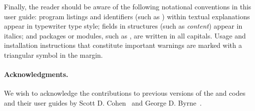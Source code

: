 Finally, the reader should be aware of the following notational conventions
in this user guide:  program listings and identifiers (such as ) 
within textual explanations appear in typewriter type style; 
fields in {\CC} structures (such as {\em content}) appear in italics;
and packages or modules, such as {\cvdls}, are written in all capitals. 
Usage and installation instructions that constitute important warnings
are marked with a triangular symbol {\warn} in the margin.

\paragraph{Acknowledgments.}
We wish to acknowledge the contributions to previous versions of the
{\cvode} and {\pvode} codes and their user guides by Scott D. Cohen~\cite{CoHi:94}
and George D. Byrne~\cite{ByHi:98}.


